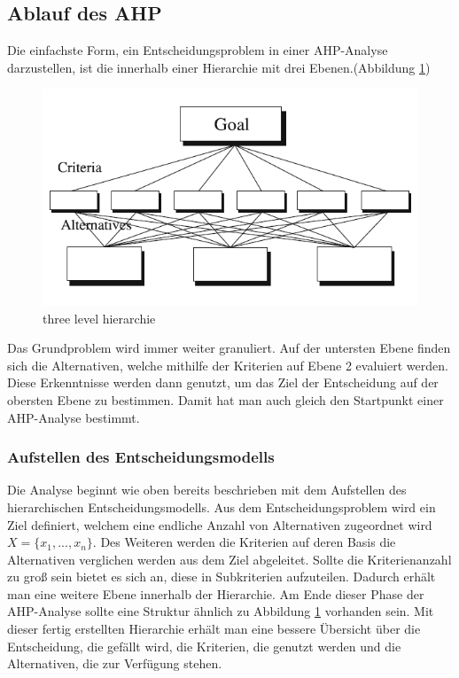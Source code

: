 \subsection{Ablauf des AHP}
Die einfachste Form, ein Entscheidungsproblem in einer AHP-Analyse darzustellen, ist die innerhalb einer Hierarchie mit drei Ebenen.(Abbildung \ref{img:hier})
\begin{figure}[h!]
	\centering
	\includegraphics[scale = 0.8]{img/Hierarchie.png}
	\caption{three level hierarchie}
	\label{img:hier}
\end{figure}
Das Grundproblem wird immer weiter granuliert. Auf der untersten Ebene finden sich die Alternativen, welche mithilfe der Kriterien auf Ebene 2 evaluiert werden. Diese Erkenntnisse werden dann genutzt, um das Ziel der Entscheidung auf der obersten Ebene zu bestimmen.\autocite[Vgl.][S.2]{Saaty.2012}
Damit hat man auch gleich den Startpunkt einer AHP-Analyse bestimmt. 
\subsubsection{Aufstellen des Entscheidungsmodells}
Die Analyse beginnt wie oben bereits beschrieben mit dem Aufstellen des hierarchischen Entscheidungsmodells. Aus dem Entscheidungsproblem wird ein Ziel definiert, welchem eine endliche Anzahl von Alternativen zugeordnet wird $X=\{x_{1}, ..., x_{n}\}$\autocite[Vgl.][S.3]{Brunelli.2015}.
Des Weiteren werden die Kriterien auf deren Basis die Alternativen verglichen werden aus dem Ziel abgeleitet. Sollte die Kriterienanzahl zu groß sein bietet es sich an, diese in Subkriterien aufzuteilen. Dadurch erhält man eine weitere Ebene innerhalb der Hierarchie. Am Ende dieser Phase der AHP-Analyse sollte eine Struktur ähnlich zu Abbildung \ref{img:hier} vorhanden sein. Mit dieser fertig erstellten Hierarchie erhält man eine bessere Übersicht über die Entscheidung, die gefällt wird, die Kriterien, die genutzt werden und die Alternativen, die zur Verfügung stehen.\autocite[Vgl.][S.9]{Mu.2018} 
